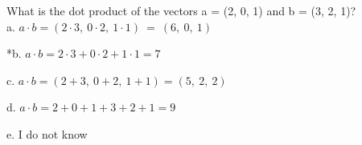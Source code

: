 
What is the dot product of the vectors a = (2, 0, 1) and b = (3, 2, 1)? \\

a. \(a \cdot b = (2 \cdot 3,\ 0 \cdot 2,\ 1 \cdot 1)\  = \ (6,\ 0,\ 1)\)

*b. \(a \cdot b = 2 \cdot 3 + 0 \cdot 2 + 1 \cdot 1 = 7\)

c. \(a \cdot b = (2 + 3,\ 0 + 2,\ 1 + 1) = (5,\ 2,\ 2)\)

d. \(a \cdot b = 2 + 0 + 1 + 3 + 2 + 1 = 9\)

e. I do not know \\
